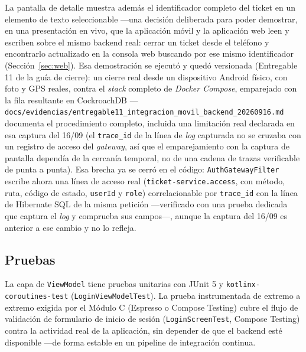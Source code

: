 La pantalla de detalle muestra además el identificador completo del ticket en un elemento de
texto seleccionable —una decisión deliberada para poder demostrar, en una presentación en vivo,
que la aplicación móvil y la aplicación web leen y escriben sobre el mismo backend real: cerrar
un ticket desde el teléfono y encontrarlo actualizado en la consola web buscando por ese mismo
identificador (Sección~\ref{sec:web}). Esa demostración se ejecutó y quedó versionada
(Entregable 11 de la guía de cierre): un cierre real desde un dispositivo Android físico, con
foto y GPS reales, contra el \emph{stack} completo de \emph{Docker Compose}, emparejado con la
fila resultante en CockroachDB —
\texttt{docs/evidencias/entregable11\_integracion\_movil\_backend\_20260916.md} documenta el
procedimiento completo, incluida una limitación real declarada en esa captura del 16/09 (el
\texttt{trace\_id} de la línea de \emph{log} capturada no se cruzaba con un registro de acceso
del \emph{gateway}, así que el emparejamiento con la captura de pantalla dependía de la cercanía
temporal, no de una cadena de trazas verificable de punta a punta). Esa brecha ya se cerró en el
código: \texttt{AuthGatewayFilter} escribe ahora una línea de acceso real
(\texttt{ticket-service.access}, con método, ruta, código de estado, \texttt{userId} y
\texttt{role}) correlacionable por \texttt{trace\_id} con la línea de Hibernate SQL de la misma
petición —verificado con una prueba dedicada que captura el \emph{log} y comprueba sus campos—,
aunque la captura del 16/09 es anterior a ese cambio y no lo refleja.

\subsection{Pruebas}

La capa de \texttt{ViewModel} tiene pruebas unitarias con JUnit 5 y \texttt{kotlinx-coroutines-test}
(\texttt{LoginViewModelTest}). La prueba instrumentada de extremo a extremo exigida por el Módulo
C (Espresso o Compose Testing) cubre el flujo de validación de formulario de inicio de sesión
(\texttt{LoginScreenTest}, Compose Testing) contra la actividad real de la aplicación, sin
depender de que el backend esté disponible —de forma estable en un pipeline de integración
continua.
